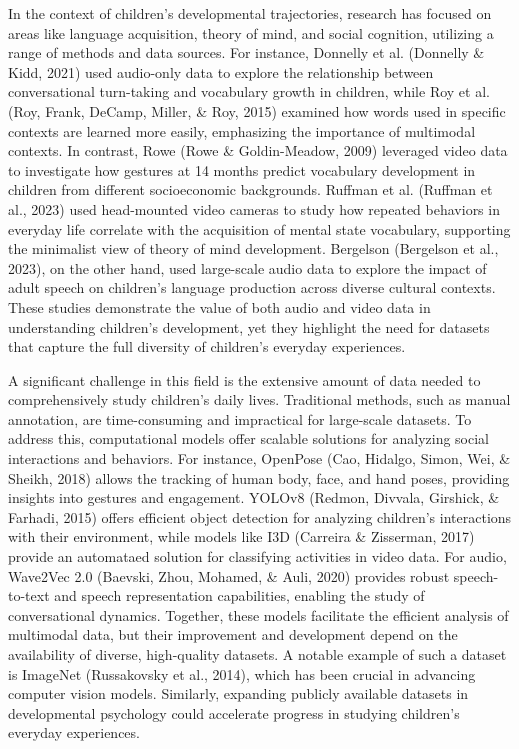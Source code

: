 \documentclass[
  man,floatsintext]{apa6}
\begin{document}
In the context of children's developmental trajectories, research has focused on areas like language acquisition, theory of mind, and social cognition, utilizing a range of methods and data sources. For instance, Donnelly et al. (Donnelly \& Kidd, 2021) used audio-only data to explore the relationship between conversational turn-taking and vocabulary growth in children, while Roy et al. (Roy, Frank, DeCamp, Miller, \& Roy, 2015) examined how words used in specific contexts are learned more easily, emphasizing the importance of multimodal contexts. In contrast, Rowe (Rowe \& Goldin-Meadow, 2009) leveraged video data to investigate how gestures at 14 months predict vocabulary development in children from different socioeconomic backgrounds. Ruffman et al. (Ruffman et al., 2023) used head-mounted video cameras to study how repeated behaviors in everyday life correlate with the acquisition of mental state vocabulary, supporting the minimalist view of theory of mind development. Bergelson (Bergelson et al., 2023), on the other hand, used large-scale audio data to explore the impact of adult speech on children's language production across diverse cultural contexts. These studies demonstrate the value of both audio and video data in understanding children's development, yet they highlight the need for datasets that capture the full diversity of children's everyday experiences.

A significant challenge in this field is the extensive amount of data needed to comprehensively study children's daily lives. Traditional methods, such as manual annotation, are time-consuming and impractical for large-scale datasets. To address this, computational models offer scalable solutions for analyzing social interactions and behaviors. For instance, OpenPose (Cao, Hidalgo, Simon, Wei, \& Sheikh, 2018) allows the tracking of human body, face, and hand poses, providing insights into gestures and engagement. YOLOv8 (Redmon, Divvala, Girshick, \& Farhadi, 2015) offers efficient object detection for analyzing children's interactions with their environment, while models like I3D (Carreira \& Zisserman, 2017) provide an automataed solution for classifying activities in video data. For audio, Wave2Vec 2.0 (Baevski, Zhou, Mohamed, \& Auli, 2020) provides robust speech-to-text and speech representation capabilities, enabling the study of conversational dynamics. Together, these models facilitate the efficient analysis of multimodal data, but their improvement and development depend on the availability of diverse, high-quality datasets. A notable example of such a dataset is ImageNet (Russakovsky et al., 2014), which has been crucial in advancing computer vision models. Similarly, expanding publicly available datasets in developmental psychology could accelerate progress in studying children's everyday experiences.
\end{document}
